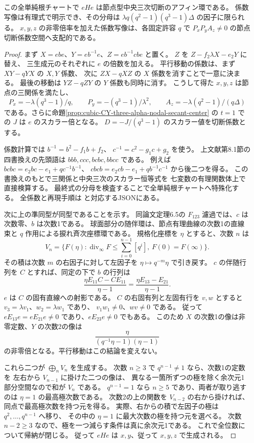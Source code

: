 \begin{theorem}\label{thm:cubic-CY-three-alpha-nodal-E6}
この全単純根チャートで $eHe$ は節点型中央三次切断のアフィン環である。
係数写像は有理式で明示でき、その分母は
$\lambda q(q^2-1)(q^3-1)\Delta$ の因子に限られる。
$x,y,z$ の非零倍率を加えた係数写像は、各固定許容 $q$ で
$P_xP_yA_z\ne0$ の節点切断係数空間へ支配的である。
\end{theorem}
\begin{proof}
まず $X=ebe$、$Y=eb^{-1}e$、$Z=eb^{-1}cbe$ と置く。
$Z$ を $Z-f_2\lambda X-e_2Y$ に替え、
三生成元のそれぞれに $e$ の倍数を加える。
平行移動の係数は、まず $XY-qYX$ の $X,Y$ 係数、
次に $ZX-qXZ$ の $X$ 係数を消すことで一意に決まる。
最後の移動は $YZ-qZY$ の $Y$ 係数も同時に消す。
こうして得た $x,y,z$ は節点の三関係を満たし、
\[
 P_x=-\lambda(q^3-1)/q,\qquad
 P_y=-(q^3-1)/\lambda^2,\qquad
 A_z=-\lambda(q^2-1)/(q\Delta)
\]
である。さらに命題\ref{prop:cubic-CY-three-alpha-nodal-secant-center}
の $t=1$ での $J$ は $e$ のスカラー倍となる。
$D=-J/(q^3-1)$ のスカラー値を切断係数とする。

係数計算では $b^{-1}=b^2-f_1b+f_2$、
$c^{-1}=c^2-g_1c+g_2$ を使う。
上文献第8.1節の四書換えの先頭語は $bbb,ccc,bcbc,bbcc$ である。
例えば $bcbc=e_2bc-e_1+q c^{-1}b^{-1}$、
$cbcb=e_2cb-e_1+q b^{-1}c^{-1}$ から後二つを得る。
この書換えのもとで三関係と中央三次のスカラー恒等式を
七変数の有理関数体上で直接検算する。
最終式の分母を検査することで全単純根チャートへ特殊化する。
全係数と再現手順は
 と対応するJSONにある。

次に上の準同型が同型であることを示す。
同論文定理6.5の $F_{123}$ 濾過では、$c$ は次数零、$b$ は次数1である。
球面部分の随伴環は、節点有理曲線の次数1の直線束と
$q$ 作用による捩れ斉次座標環である。
規格化座標を $\eta$ とすると、次数 $n$ は
\[
 V_n=\bigl\{F(\eta):\operatorname{div}_\infty F
        \le \textstyle\sum_{i=0}^{n-1}[q^i],\ F(0)=F(\infty)\bigr\}.
\]
その積は次数 $m$ の右因子に対して左因子を $\eta\mapsto q^{-m}\eta$ で引き戻す。
$c$ の伴随行列を $C$ とすれば、同定の下で $b$ の行列は
\[
 \frac{\eta E_{11}C-CE_{11}}{\eta-1}
 =\frac{\eta E_{13}-E_{21}}{\eta-1}.
\]
$e$ は $C$ の固有直線への射影である。
$C$ の右固有列と左固有行を $v,w$ とすると
$v_3=\lambda v_1$、$w_2=\lambda w_1$ であり、
$v_1w_1\ne0$、$wv\ne0$ である。
従って $eE_{13}e=eE_{21}e\ne0$ であり、$eE_{23}e\ne0$ でもある。
このため $X$ の次数1の像は非零定数、$Y$ の次数2の像は
\[
 \frac{\eta}{(q^{-1}\eta-1)(\eta-1)}
\]
の非零倍となる。平行移動はこの結論を変えない。

これら二つが $\bigoplus_n V_n$ を生成する。
次数 $n\ge3$ で $q^{n-1}\ne1$ なら、次数1の定数を
左右から $V_{n-1}$ に掛けた二つの像は、
異なる一箇所ずつの極を除く余次元1部分空間なので和が $V_n$ である。
$q^{n-1}=1$ なら $n\ge5$ であり、両者が取り逃すのは $\eta=1$ の最高極次数である。
次数2の上の関数を $V_{n-2}$ の右から掛ければ、同点で最高極次数を持つ元を得る。
実際、右からの積で左因子の極は $q^2,\ldots,q^{n-1}$ へ移り、
その中の $\eta=1$ に最大次数の極を持つ元を選べる。
次数 $n-2\ge3$ なので、極を一つ減らす条件は真に余次元1である。
これで全位数について帰納が閉じる。
従って $eHe$ は $x,y$、従って $x,y,z$ で生成される。


\end{proof}
